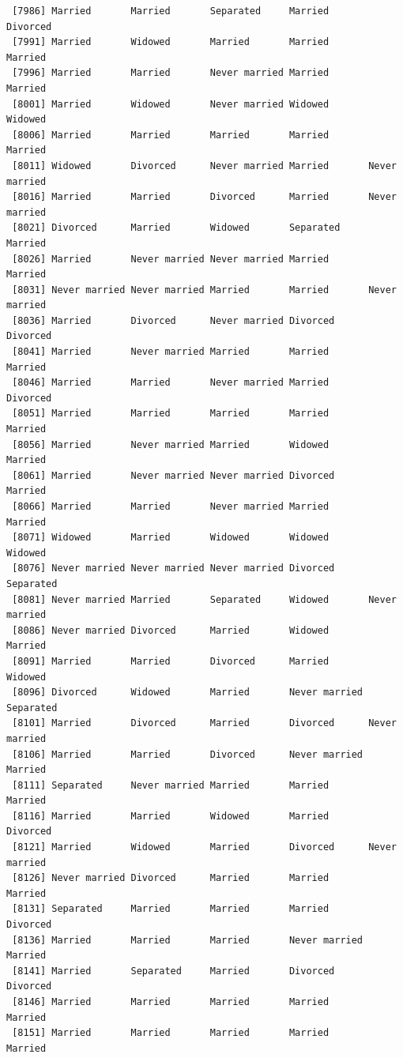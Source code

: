 \documentclass[
  letterpaper,
  DIV=11,
  numbers=noendperiod,
  oneside]{scrartcl}
\begin{document}
\begin{verbatim}
 [7986] Married       Married       Separated     Married       Divorced     
 [7991] Married       Widowed       Married       Married       Married      
 [7996] Married       Married       Never married Married       Married      
 [8001] Married       Widowed       Never married Widowed       Widowed      
 [8006] Married       Married       Married       Married       Married      
 [8011] Widowed       Divorced      Never married Married       Never married
 [8016] Married       Married       Divorced      Married       Never married
 [8021] Divorced      Married       Widowed       Separated     Married      
 [8026] Married       Never married Never married Married       Married      
 [8031] Never married Never married Married       Married       Never married
 [8036] Married       Divorced      Never married Divorced      Divorced     
 [8041] Married       Never married Married       Married       Married      
 [8046] Married       Married       Never married Married       Divorced     
 [8051] Married       Married       Married       Married       Married      
 [8056] Married       Never married Married       Widowed       Married      
 [8061] Married       Never married Never married Divorced      Married      
 [8066] Married       Married       Never married Married       Married      
 [8071] Widowed       Married       Widowed       Widowed       Widowed      
 [8076] Never married Never married Never married Divorced      Separated    
 [8081] Never married Married       Separated     Widowed       Never married
 [8086] Never married Divorced      Married       Widowed       Married      
 [8091] Married       Married       Divorced      Married       Widowed      
 [8096] Divorced      Widowed       Married       Never married Separated    
 [8101] Married       Divorced      Married       Divorced      Never married
 [8106] Married       Married       Divorced      Never married Married      
 [8111] Separated     Never married Married       Married       Married      
 [8116] Married       Married       Widowed       Married       Divorced     
 [8121] Married       Widowed       Married       Divorced      Never married
 [8126] Never married Divorced      Married       Married       Married      
 [8131] Separated     Married       Married       Married       Divorced     
 [8136] Married       Married       Married       Never married Married      
 [8141] Married       Separated     Married       Divorced      Divorced     
 [8146] Married       Married       Married       Married       Married      
 [8151] Married       Married       Married       Married       Married      

\end{verbatim}
\end{document}
